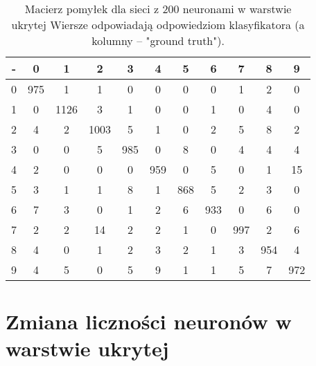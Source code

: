 \documentclass[a4paper]{article}
\begin{document}
\begin{table}[!hbt]
    \caption{Macierz pomyłek dla sieci z 200 neuronami w warstwie ukrytej
    Wiersze odpowiadają odpowiedziom klasyfikatora (a kolumny -- "ground truth").
    \label{table:confusion1}
    }
\footnotesize
\begin{center}
    \begin{tabular}{ 
        |@{\hskip3pt}c@{\hskip3pt}
        |@{\hskip3pt}c@{\hskip3pt}
        |@{\hskip3pt}c@{\hskip3pt}
        |@{\hskip3pt}c@{\hskip3pt}
        |@{\hskip3pt}c@{\hskip3pt}
        |@{\hskip3pt}c@{\hskip3pt}
        |@{\hskip3pt}c@{\hskip3pt}
        |@{\hskip3pt}c@{\hskip3pt}
        |@{\hskip3pt}c@{\hskip3pt}
        |@{\hskip3pt}c@{\hskip3pt}
        |@{\hskip3pt}c@{\hskip3pt}|
        }
    \hline
- &         0&     1&     2&     3&     4&     5&     6&     7&     8&    9 \\
    \hline
0 &       975&     1&     1&     0&     0&     0&     0&     1&     2&     0 \\
1 &         0&  1126&     3&     1&     0&     0&     1&     0&     4&     0 \\
2 &         4&     2&  1003&     5&     1&     0&     2&     5&     8&     2 \\
3 &         0&     0&     5&   985&     0&     8&     0&     4&     4&     4 \\
4 &         2&     0&     0&     0&   959&     0&     5&     0&     1&    15 \\
5 &         3&     1&     1&     8&     1&   868&     5&     2&     3&     0 \\
6 &         7&     3&     0&     1&     2&     6&   933&     0&     6&     0 \\
7 &         2&     2&    14&     2&     2&     1&     0&   997&     2&     6 \\
8 &         4&     0&     1&     2&     3&     2&     1&     3&   954&     4 \\
9&         4&     5&     0&     5&     9&     1&     1&     5&     7&   972 \\

    \hline
    \end{tabular}
\end{center}
\end{table}

\section{Zmiana liczności neuronów w warstwie ukrytej}
\end{document}

